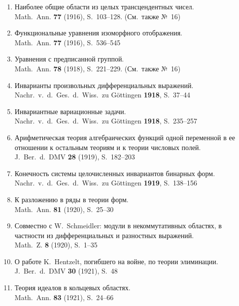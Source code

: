 \documentclass[11pt]{article}
\newcommand{\foreign}[1]{#1}
\begin{document}
\begin{enumerate}[label={\small\arabic*.},leftmargin=2em,itemsep=0.3em]
\item Наиболее общие области из целых трансцендентных чисел.\\
\foreign{Math.\ Ann.} \textbf{77} (1916), S.~103--128. (См.\ также №~16)

\item Функциональные уравнения изоморфного отображения.\\
\foreign{Math.\ Ann.} \textbf{77} (1916), S.~536--545

\item Уравнения с предписанной группой.\\
\foreign{Math.\ Ann.} \textbf{78} (1918), S.~221--229. (См.\ также №~16)

\item Инварианты произвольных дифференциальных выражений.\\
\foreign{Nachr.\ v.\ d.\ Ges.\ d.\ Wiss.\ zu Göttingen} \textbf{1918}, S.~37--44

\item Инвариантные вариационные задачи.\\
\foreign{Nachr.\ v.\ d.\ Ges.\ d.\ Wiss.\ zu Göttingen} \textbf{1918}, S.~235--257

\item Арифметическая теория алгебраических функций одной переменной в ее отношении к остальным теориям и к теории числовых полей.\\
\foreign{J.\ Ber.\ d.\ DMV} \textbf{28} (1919), S.~182--203

\item Конечность системы целочисленных инвариантов бинарных форм.\\
\foreign{Nachr.\ v.\ d.\ Ges.\ d.\ Wiss.\ zu Göttingen} \textbf{1919}, S.~138--156

\item К разложению в ряды в теории форм.\\
\foreign{Math.\ Ann.} \textbf{81} (1920), S.~25--30

\item Совместно с W.\ Schmeidler: модули в некоммутативных областях, в частности из дифференциальных и разностных выражений.\\
\foreign{Math.\ Z.} \textbf{8} (1920), S.~1--35

\item О работе K.\ Hentzelt, погибшего на войне, по теории элиминации.\\
\foreign{J.\ Ber.\ d.\ DMV} \textbf{30} (1921), S.~48

\item Теория идеалов в кольцевых областях.\\
\foreign{Math.\ Ann.} \textbf{83} (1921), S.~24--66


\end{enumerate}
\end{document}
